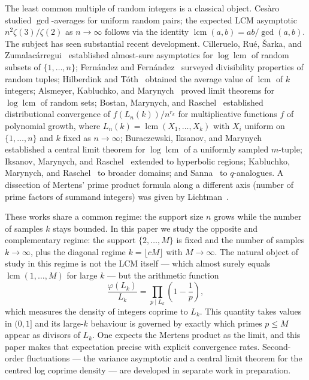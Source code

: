 \documentclass[11pt]{article}
\theoremstyle{remark}
\newcommand{\lcm}{\operatorname{lcm}}
\begin{document}
The least common multiple of random integers is a classical object. Ces\`aro~\cite{Cesaro1885} studied $\gcd$-averages for uniform random pairs; the expected LCM asymptotic $n^2 \zeta(3)/\zeta(2)$ as $n \to \infty$ follows via the identity $\lcm(a,b) = ab/\gcd(a,b)$. The subject has seen substantial recent development. Cilleruelo, Ru\'e, \v{S}arka, and Zumalac\'arregui~\cite{CilleruleoRueSarkaZumalacarregui2014} established almost-sure asymptotics for $\log \lcm$ of random subsets of $\{1, \ldots, n\}$; Fern\'andez and Fern\'andez~\cite{FernandezFernandez2021} surveyed divisibility properties of random tuples; Hilberdink and T\'oth~\cite{HilberdinkToth2016} obtained the average value of $\lcm$ of $k$ integers; Alsmeyer, Kabluchko, and Marynych~\cite{AlsmeyerKabluchkoMarynych2019} proved limit theorems for $\log \lcm$ of random sets; Bostan, Marynych, and Raschel~\cite{BostanMarynychRaschel2019} established distributional convergence of $f(L_n(k))/n^{r_k}$ for multiplicative functions $f$ of polynomial growth, where $L_n(k) = \lcm(X_1, \ldots, X_k)$ with $X_i$ uniform on $\{1, \ldots, n\}$ and $k$ fixed as $n \to \infty$; Buraczewski, Iksanov, and Marynych~\cite{BuraczewskiIksanovMarynych2022} established a central limit theorem for $\log \lcm$ of a uniformly sampled $m$-tuple; Iksanov, Marynych, and Raschel~\cite{IksanovMarynychRaschel2022} extended to hyperbolic regions; Kabluchko, Marynych, and Raschel~\cite{KabluchkoMarynychRaschel2023} to broader domains; and Sanna~\cite{Sanna2021} to $q$-analogues. A dissection of Mertens' prime product formula along a different axis (number of prime factors of summand integers) was given by Lichtman~\cite{Lichtman2021}.

These works share a common regime: the support size $n$ grows while the number of samples $k$ stays bounded. In this paper we study the opposite and complementary regime: the support $\{2, \ldots, M\}$ is fixed and the number of samples $k \to \infty$, plus the diagonal regime $k = \lfloor cM \rfloor$ with $M \to \infty$. The natural object of study in this regime is not the LCM itself --- which almost surely equals $\lcm(1, \ldots, M)$ for large $k$ --- but the arithmetic function
\[
\frac{\varphi(L_k)}{L_k} = \prod_{p \mid L_k}\!\left(1 - \frac{1}{p}\right),
\]
which measures the density of integers coprime to $L_k$. This quantity takes values in $(0, 1]$ and its large-$k$ behaviour is governed by exactly which primes $p \leq M$ appear as divisors of $L_k$. One expects the Mertens product as the limit, and this paper makes that expectation precise with explicit convergence rates. Second-order fluctuations --- the variance asymptotic and a central limit theorem for the centred log coprime density --- are developed in separate work in preparation.
\end{document}
